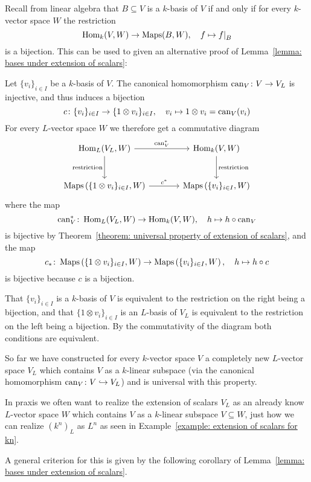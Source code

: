 \begin{remark}
  Recall from linear algebra that $B \subseteq V$ is a $k$-basis of $V$ if and only if for every $k$-vector space $W$ the restriction
  \[
            \Hom_k(V,W)
    \to     \Maps(B,W),
    \quad   f
    \mapsto \restrict{f}{B}
  \]
  is a bijection.
  This can be used to given an alternative proof of Lemma~\ref{lemma: bases under extension of scalars}:
  
  Let $\{v_i\}_{i \in I}$ be a $k$-basis of $V$.
  The canonical homomorphism $\operatorname{can}_V \colon V \to V_L$ is injective, and thus induces a bijection
  \[
            c
    \colon  \{v_i\}_{i \in I}
    \to     \{1 \otimes v_i\}_{i \in I},
    \quad   v_i
    \mapsto 1 \otimes v_i
    =       \operatorname{can}_V(v_i)
  \]
  For every $L$-vector space $W$ we therefore get a commutative diagram
  \[
    \begin{tikzcd}[sep = large]
        \Hom_L(V_L, W)
        \arrow{r}[above]{\can_V^*}
        \arrow{d}[left]{\text{restriction}}
      & \Hom_k(V,W)
        \arrow{d}[right]{\text{restriction}}
      \\
        \Maps\left( \{1 \otimes v_i\}_{i \in I}, W \right)
        \arrow{r}[above]{c^*}
      & \Maps\left( \{v_i\}_{i \in I}, W \right)
    \end{tikzcd}
  \]
  where the map
  \[
            \operatorname{can}_V^*
    \colon  \operatorname{Hom}_L(V_L, W)
    \to     \operatorname{Hom}_k(V, W),
    \quad   h
    \mapsto h \circ \operatorname{can}_V
  \]
  is bijective by Theorem~\ref{theorem: universal property of extension of scalars}, and the map
  \[
            c_*
    \colon  \operatorname{Maps}\left( \{1 \otimes v_i\}_{i \in I}, W \right)
    \to     \operatorname{Maps}\left( \{v_i\}_{i \in I}, W \right),
    \quad   h
    \mapsto h \circ c
  \]
  is bijective because $c$ is a bijection.
  
  That $\{v_i\}_{i \in I}$ is a $k$-basis of $V$ is equivalent to the restriction on the right being a bijection, and that $\{1 \otimes v_i\}_{i \in I}$ is an $L$-basis of $V_L$ is equivalent to the restriction on the left being a bijection.
  By the commutativity of the diagram both conditions are equivalent.
\end{remark}


\begin{fluff}
  So far we have constructed for every $k$-vector space $V$ a completely new $L$-vector space $V_L$ which contains $V$ as a $k$-linear subspace (via the canonical homomorphism $\operatorname{can}_V \colon V \hookrightarrow V_L$) and is universal with this property.
  
  In praxis we often want to realize the extension of scalars $V_L$ as an already know $L$-vector space $W$ which contains $V$ as a $k$-linear subspace $V \subseteq W$, just how we can realize $(k^n)_L$ as $L^n$ as seen in Example~\ref{example: extension of scalars for kn}.
  
  A general criterion for this is given by the following corollary of Lemma~\ref{lemma: bases under extension of scalars}.
\end{fluff}


